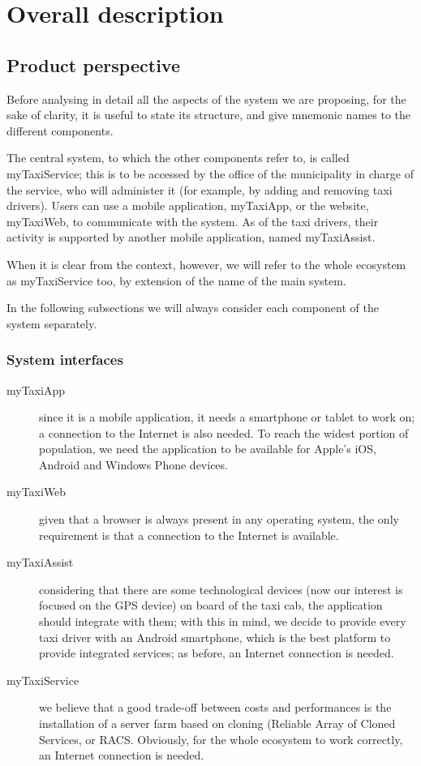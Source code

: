 \chapter{Overall description}

\section{Product perspective}

Before analysing in detail all the aspects of the system we are proposing, for the sake of clarity, it is useful to state its structure, and give mnemonic names to the different components. 

The central system, to which the other components refer to, is called myTaxiService; this is to be accessed by the office of the municipality in charge of the service, who will administer it (for example, by adding and removing taxi drivers). Users can use a mobile application, myTaxiApp, or the website, myTaxiWeb, to communicate with the system. As of the taxi drivers, their activity is supported by another mobile application, named myTaxiAssist. 

When it is clear from the context, however, we will refer to the whole ecosystem as myTaxiService too, by extension of the name of the main system. 

In the following subsections we will always consider each component of the system separately.


\subsection{System interfaces}

\begin{description}
	\item [myTaxiApp] since it is a mobile application, it needs a smartphone or tablet to work on; a connection to the Internet is also needed. To reach the widest portion of population, we need the application to be available for Apple’s iOS, Android and Windows Phone devices.
	\item [myTaxiWeb] given that a browser is always present in any operating system, the only requirement is that a connection to the Internet is available.
	\item [myTaxiAssist] considering that there are some technological devices (now our interest is focused on the GPS device) on board of the taxi cab, the application should integrate with them; with this in mind, we decide to provide every taxi driver with an Android smartphone, which is the best platform to provide integrated services; as before, an Internet connection is needed.
	\item [myTaxiService] we believe that a good trade-off between costs and performances is the installation of a server farm based on cloning (Reliable Array of Cloned Services, or RACS. Obviously, for the whole ecosystem to work correctly, an Internet connection is needed.
\end{description}


